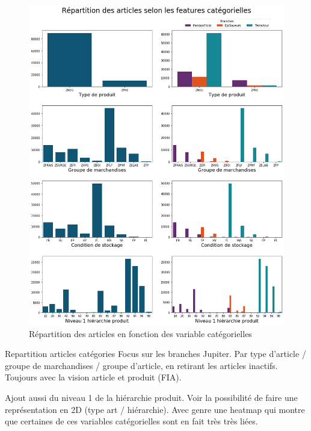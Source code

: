             \begin{figure}[htbp]
                \begin{center}
                \includegraphics[width=\linewidth]{img/Repartition articles categories.png}
                \end{center}
                \caption{Répartition des articles en fonction des variable catégorielles}
                \label{fig:repart_art_categ}
            \end{figure}

            Repartition articles catégories
            Focus sur les branches Jupiter.
            Par type d'article / groupe de marchandises / groupe d'article, en retirant les articles inactifs. Toujours avec la vision article et produit (FIA).

            Ajout aussi du niveau 1 de la hiérarchie produit. Voir la possibilité de faire une représentation en 2D (type art / hiérarchie). Avec genre une heatmap qui montre que certaines de ces variables catégorielles sont en fait très très liées.

